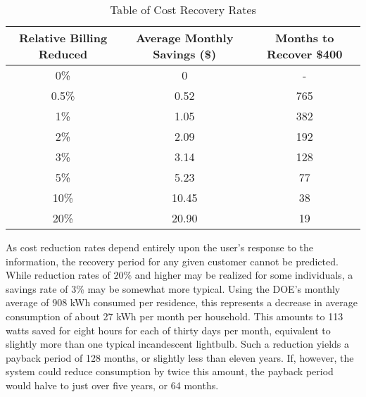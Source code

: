 \begin{table}[htbp]
 \caption{Table of Cost Recovery Rates} \label{tab:cost-recoup}
 \begin{center}
 \begin{tabular}{|c|c|c|} \hline
 \rowcolor{lightgray}
 Relative Billing Reduced & Average Monthly Savings (\$) & Months to Recover \$400 \\ \hline
 0\% & 0 & - \\ \hline
 0.5\% & 0.52 & 765 \\ \hline
 1\% & 1.05 & 382 \\ \hline
 2\% & 2.09 & 192 \\ \hline
 3\% & 3.14 & 128 \\ \hline
 5\% & 5.23 & 77 \\ \hline
 10\% & 10.45 & 38 \\ \hline
 20\% & 20.90 & 19 \\ \hline
 \end{tabular}
 \end{center}
\end{table}

 As cost reduction rates depend entirely upon the user's response to the information, the recovery period for any given customer cannot be predicted. While reduction rates of $20\%$ and higher may be realized for some individuals, a savings rate of 3\% may be somewhat more typical. Using the \ac{DOE}'s monthly average of 908 kWh consumed per residence, this represents a decrease in average consumption of about 27 kWh per month per household. This amounts to 113 watts saved for eight hours for each of thirty days per month, equivalent to slightly more than one typical incandescent lightbulb. Such a reduction yields a payback period of 128 months, or slightly less than eleven years. If, however, the system could reduce consumption by twice this amount, the payback period would halve to just over five years, or 64 months.

